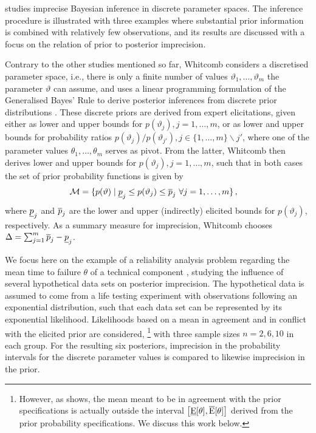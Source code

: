 \medskip

\textcite{2005:whitcomb} studies imprecise Bayesian inference in discrete parameter spaces.
The inference procedure is illustrated with three examples
where substantial prior information is combined with relatively few observations,
and its results are discussed with a focus on the relation of prior to posterior imprecision.

Contrary to the other studies mentioned so far,
Whitcomb considers a discretised parameter space,
i.e., there is only a finite number of values $\vartheta_1, \ldots, \vartheta_m$ the parameter $\vartheta$ can assume,
and uses a linear programming formulation of the Generalised Bayes' Rule
to derive posterior inferences from discrete prior distributions \parencite[\S 3]{2005:whitcomb}. %
These discrete priors are derived from expert elicitations,
given either as lower and upper bounds for $p(\vartheta_j), j=1,\ldots,m$,
or as lower and upper bounds for probability ratios $p(\vartheta_j)/p(\vartheta_{j'}), j\in\{1,\ldots,m\} \backslash j'$,
where one of the parameter values $\theta_1, \ldots, \theta_m$ serves as pivot. %
From the latter, Whitcomb then derives lower and upper bounds for $p(\vartheta_j), j=1,\ldots,m$,
such that in both cases the set of prior probability functions is given by
\begin{align*}
\mathcal{M} &= \{ p(\vartheta) \mid \underline{p}_j \le p(\vartheta_j) \le \overline{p}_j\ \forall j=1,\ldots,m \}\,,
\end{align*}
where $\underline{p}_j$ and $\overline{p}_j$ are the lower and upper (indirectly) elicited bounds for $p(\vartheta_j)$, respectively.
As a summary measure for imprecision, Whitcomb chooses $\Delta = \sum_{j=1}^m \overline{p}_j-\underline{p}_j$.

We focus here on the example of a reliability analysis problem
regarding the mean time to failure $\theta$ of a technical component \parencite[\S 4.1]{2005:whitcomb}, %
studying the influence of several hypothetical data sets on posterior imprecision.
The hypothetical data is assumed to come from a life testing experiment
with observations following an exponential distribution,
such that each data set can be represented by its exponential likelihood.
Likelihoods based on a mean in agreement
and in conflict with the elicited prior are considered,%
\footnote{However, as \textcite[\S 4.3]{2011:krautenbacher} shows, the mean meant to be in agreement with
the prior specifications is actually outside the interval $\big[\underline{\operatorname{E}}[\theta], \overline{\operatorname{E}}[\theta]\big]$
derived from the prior probability specifications. We discuss this work below.}
with three sample sizes $n=2,6,10$ in each group.
For the resulting six posteriors, imprecision in the probability intervals for the discrete parameter values
is compared to likewise imprecision in the prior.

